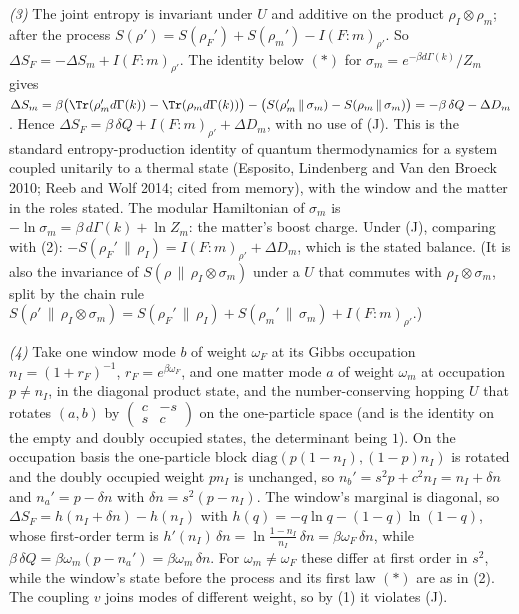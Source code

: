 \emph{(3)} The joint entropy is invariant under $U$ and additive on the product $\rho_{I}\otimes\rho_{m}$; after the process $S(\rho') = S(\rho_{F}') + S(\rho_{m}') - I(F{:}m)_{\rho'}$. So $\Delta S_{F} = -\Delta S_{m} + I(F{:}m)_{\rho'}$. The identity below $(*)$ for $\sigma_{m} = e^{-\beta d\Gamma(k)}/Z_{m}$ gives $\Delta S_{m} = \beta\big(\Tr(\rho_{m}'d\Gamma(k)) - \Tr(\rho_{m}d\Gamma(k))\big) - \big(S(\rho_{m}'\,\|\,\sigma_{m}) - S(\rho_{m}\,\|\,\sigma_{m})\big) = -\beta\,\delta Q - \Delta D_{m}$. Hence $\Delta S_{F} = \beta\,\delta Q + I(F{:}m)_{\rho'} + \Delta D_{m}$, with no use of (J). This is the standard entropy-production identity of quantum thermodynamics for a system coupled unitarily to a thermal state (Esposito, Lindenberg and Van den Broeck 2010; Reeb and Wolf 2014; cited from memory), with the window and the matter in the roles stated. The modular Hamiltonian of $\sigma_{m}$ is $-\ln\sigma_{m} = \beta\,d\Gamma(k) + \ln Z_{m}$: the matter's boost charge. Under (J), comparing with (2): $-S(\rho_{F}'\,\|\,\rho_{I}) = I(F{:}m)_{\rho'} + \Delta D_{m}$, which is the stated balance. (It is also the invariance of $S(\rho\,\|\,\rho_{I}\otimes\sigma_{m})$ under a $U$ that commutes with $\rho_{I}\otimes\sigma_{m}$, split by the chain rule $S(\rho'\,\|\,\rho_{I}\otimes\sigma_{m}) = S(\rho_{F}'\,\|\,\rho_{I}) + S(\rho_{m}'\,\|\,\sigma_{m}) + I(F{:}m)_{\rho'}$.)

\emph{(4)} Take one window mode $b$ of weight $\omega_{F}$ at its Gibbs occupation $n_{I} = (1 + r_{F})^{-1}$, $r_{F} = e^{\beta\omega_{F}}$, and one matter mode $a$ of weight $\omega_{m}$ at occupation $p \neq n_{I}$, in the diagonal product state, and the number-conserving hopping $U$ that rotates $(a, b)$ by $\begin{pmatrix} c & -s\\ s & c\end{pmatrix}$ on the one-particle space (and is the identity on the empty and doubly occupied states, the determinant being $1$). On the occupation basis the one-particle block $\mathrm{diag}(p(1 - n_{I}), (1 - p)n_{I})$ is rotated and the doubly occupied weight $pn_{I}$ is unchanged, so $n_{b}' = s^{2}p + c^{2}n_{I} = n_{I} + \delta n$ and $n_{a}' = p - \delta n$ with $\delta n = s^{2}(p - n_{I})$. The window's marginal is diagonal, so $\Delta S_{F} = h(n_{I} + \delta n) - h(n_{I})$ with $h(q) = -q\ln q - (1 - q)\ln(1 - q)$, whose first-order term is $h'(n_{I})\,\delta n = \ln\frac{1 - n_{I}}{n_{I}}\,\delta n = \beta\omega_{F}\,\delta n$, while $\beta\,\delta Q = \beta\omega_{m}(p - n_{a}') = \beta\omega_{m}\,\delta n$. For $\omega_{m} \neq \omega_{F}$ these differ at first order in $s^{2}$, while the window's state before the process and its first law $(*)$ are as in (2). The coupling $v$ joins modes of different weight, so by (1) it violates (J).

